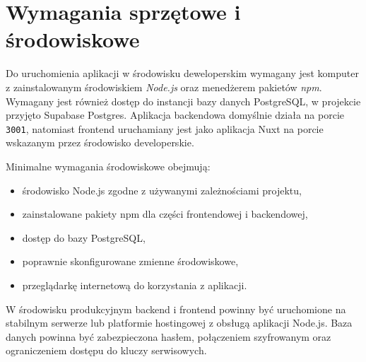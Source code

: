 \section{Wymagania sprzętowe i środowiskowe}
\label{sec:wymagania-sprzetowe}

Do uruchomienia aplikacji w środowisku deweloperskim wymagany jest komputer z zainstalowanym środowiskiem \textit{Node.js} oraz menedżerem pakietów \textit{npm}. Wymagany jest również dostęp do instancji bazy danych PostgreSQL, w projekcie przyjęto Supabase Postgres. Aplikacja backendowa domyślnie działa na porcie \texttt{3001}, natomiast frontend uruchamiany jest jako aplikacja Nuxt na porcie wskazanym przez środowisko developerskie.

Minimalne wymagania środowiskowe obejmują:
\begin{itemize}
    \item środowisko Node.js zgodne z używanymi zależnościami projektu,
    \item zainstalowane pakiety npm dla części frontendowej i backendowej,
    \item dostęp do bazy PostgreSQL,
    \item poprawnie skonfigurowane zmienne środowiskowe,
    \item przeglądarkę internetową do korzystania z aplikacji.
\end{itemize}

W środowisku produkcyjnym backend i frontend powinny być uruchomione na stabilnym serwerze lub platformie hostingowej z obsługą aplikacji Node.js. Baza danych powinna być zabezpieczona hasłem, połączeniem szyfrowanym oraz ograniczeniem dostępu do kluczy serwisowych.
